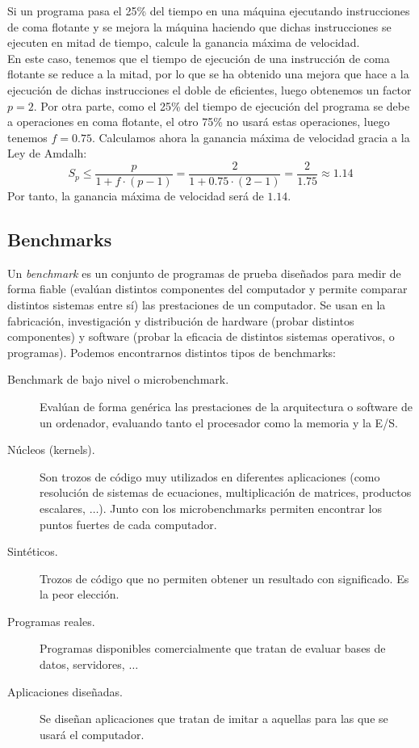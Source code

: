 \begin{ejemplo}
    Si un programa pasa el 25\% del tiempo en una máquina ejecutando instrucciones de coma flotante y se mejora la máquina haciendo que dichas instrucciones se ejecuten en mitad de tiempo, calcule la ganancia máxima de velocidad.\\

    En este caso, tenemos que el tiempo de ejecución de una instrucción de coma flotante se reduce a la mitad, por lo que se ha obtenido una mejora que hace a la ejecución de dichas instrucciones el doble de eficientes, luego obtenemos un factor $p = 2$. Por otra parte, como el 25\% del tiempo de ejecución del programa se debe a operaciones en coma flotante, el otro 75\% no usará estas operaciones, luego tenemos $f = 0.75$. Calculamos ahora la ganancia máxima de velocidad gracia a la Ley de Amdalh:
    \begin{equation*}
        S_p \leq \dfrac{p}{1+f\cdot(p-1)} = \dfrac{2}{1+0.75\cdot(2-1)}= \dfrac{2}{1.75} \approx 1.14
    \end{equation*}
    Por tanto, la ganancia máxima de velocidad será de $1.14$.
\end{ejemplo}

\subsection{Benchmarks}
Un \emph{benchmark} es un conjunto de programas de prueba diseñados para medir de forma fiable (evalúan distintos componentes del computador y permite comparar distintos sistemas entre sí) las prestaciones de un computador. Se usan en la fabricación, investigación y distribución de hardware (probar distintos componentes) y software (probar la eficacia de distintos sistemas operativos, o programas). Podemos encontrarnos distintos tipos de benchmarks:

\begin{description}
    \item [Benchmark de bajo nivel o microbenchmark.]
        Evalúan de forma genérica las prestaciones de la arquitectura o software de un ordenador, evaluando tanto el procesador como la memoria y la E/S.
    \item [Núcleos (kernels).]
        Son trozos de código muy utilizados en diferentes aplicaciones (como resolución de sistemas de ecuaciones, multiplicación de matrices, productos escalares, $\ldots$). Junto con los microbenchmarks permiten encontrar los puntos fuertes de cada computador.
    \item [Sintéticos.]
        Trozos de código que no permiten obtener un resultado con significado. Es la peor elección.
    \item [Programas reales.]
        Programas disponibles comercialmente que tratan de evaluar bases de datos, servidores, $\ldots$
    \item [Aplicaciones diseñadas.]
        Se diseñan aplicaciones que tratan de imitar a aquellas para las que se usará el computador. 
\end{description}

\newpage
